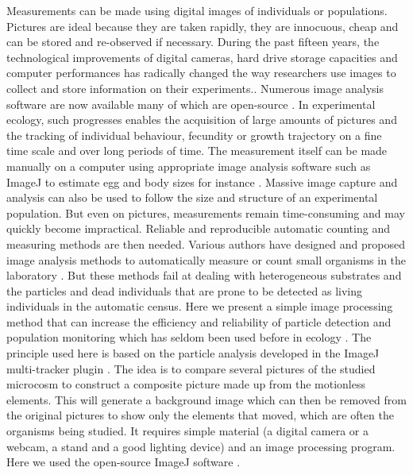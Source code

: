Measurements can be made using digital images of individuals or populations.
Pictures are ideal because they are taken rapidly, they are innocuous, cheap and
can be stored and re-observed if necessary. During the past fifteen years, the
technological improvements of digital cameras, hard drive storage capacities and
computer performances \autocites{walter2005a} has radically changed the way
researchers use images to collect and store information on their experiments..
Numerous image analysis software are now available \autocites{eliceiri2012a} many of which
are open-source \autocites{schneider2012a}. In experimental ecology, such progresses
enables the acquisition of large amounts of pictures and the tracking of individual behaviour, fecundity or growth
trajectory on a fine time scale and over long periods of time. The measurement
itself can be made manually on a computer using appropriate image analysis
software such as ImageJ \autocites{schneider2012a,abramoff2004a} to estimate egg
and body sizes for instance \autocites{tully2008a,plaistow2009a}. Massive image
capture and analysis can also be used to follow the size and structure of an experimental population. But even on pictures, measurements
remain time-consuming and may quickly become impractical. Reliable and
reproducible automatic counting and measuring methods are then needed.
Various authors have designed and proposed image analysis methods to
automatically measure or count small organisms in the laboratory
\autocites{hooper2006a,krogh1998a,auclerc2010a,lukas2009a,marcal2006a}.
But these methods fail at dealing with heterogeneous substrates and the particles
and dead individuals that are prone to be detected as living individuals in the
automatic census. Here we present a simple image processing method that can
increase the efficiency and reliability of particle detection and population
monitoring which has seldom been used before in ecology
\autocites{faerovig2002a,mallard2012a}.
The principle used here is based on the particle analysis developed in the ImageJ
multi-tracker plugin \autocites{kuhn2001a}. The idea is to compare several pictures
of the studied microcosm to construct a composite picture made  up from the motionless
elements. This will generate a background image which can then be removed from
the original pictures to show only the elements that moved, which are often the
organisms being studied. It requires simple material (a digital camera or a
webcam, a stand and a good lighting device) and an image processing program.
Here we used the open-source ImageJ software \autocites{abramoff2004a}.

